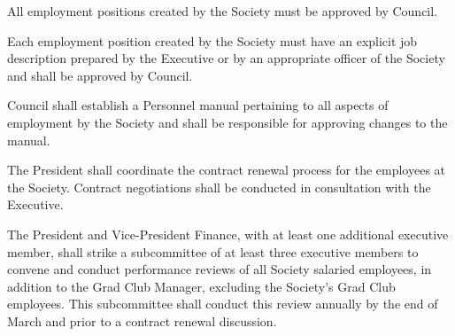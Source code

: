 \begin{longenum}[ label*=\thesection.\arabic*., align=left]
	\item All employment positions created by the Society must be approved by Council.
    \item Each employment position created by the Society must have an explicit job description prepared by the Executive or by an appropriate officer of the Society and shall be approved by Council. 
    \item Council shall establish a Personnel manual pertaining to all aspects of employment by the Society and shall be responsible for approving changes to the manual.
    \item The President shall coordinate the contract renewal process for the employees at the Society. Contract negotiations shall be conducted in consultation with the Executive.
    \item The President and Vice-President Finance, with at least one additional executive member, shall strike a subcommittee of at least three executive members to convene and conduct performance reviews of all Society salaried employees, in addition to the Grad Club Manager, excluding the Society's Grad Club employees. This subcommittee shall conduct this review annually by the end of March and prior to a contract renewal discussion.
\end{longenum}

\newpage

